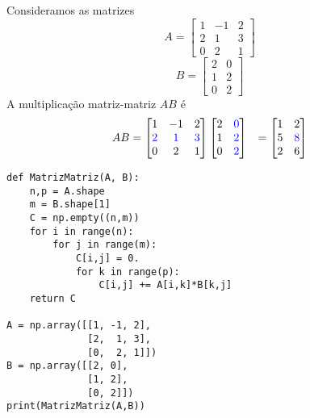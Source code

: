\begin{ex}
  Consideramos as matrizes
  \begin{equation}
    A =
    \begin{bmatrix}
      1 & -1 & 2\\
      2 & 1 & 3\\
      0 & 2 & 1
    \end{bmatrix}
  \end{equation}
  \begin{equation}
    B =
    \begin{bmatrix}
      2 & 0\\
      1 & 2\\
      0 & 2
    \end{bmatrix}
  \end{equation}
  A multiplicação matriz-matriz $AB$ é
  \begin{subequations}
    \begin{align}
      AB &= \begin{bmatrix}
      1 & -1 & 2\\
      \color{blue}2 & \color{blue}1 & \color{blue}3\\
      0 & 2 & 1
    \end{bmatrix}\begin{bmatrix}
      2 & \color{blue}0\\
      1 & \color{blue}2\\
      0 & \color{blue}2
    \end{bmatrix}
        &=
          \begin{bmatrix}
            1 & 2\\
            5 & \color{blue}8\\
            2 & 6
          \end{bmatrix}
    \end{align}
  \end{subequations}

\begin{lstlisting}
def MatrizMatriz(A, B):
    n,p = A.shape
    m = B.shape[1]
    C = np.empty((n,m))
    for i in range(n):
        for j in range(m):
            C[i,j] = 0.
            for k in range(p):
                C[i,j] += A[i,k]*B[k,j]
    return C

A = np.array([[1, -1, 2],
              [2,  1, 3],
              [0,  2, 1]])
B = np.array([[2, 0],
              [1, 2],
              [0, 2]])
print(MatrizMatriz(A,B))
\end{lstlisting}
\end{ex}

